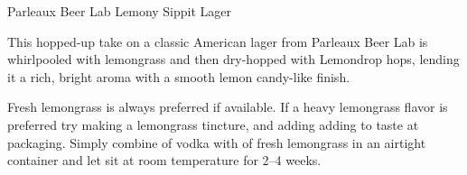 \stylesection{\styleamericanlager}

\begin{recipie}{Parleaux Beer Lab Lemony Sippit Lager}

\begin{aboutblock}
This hopped-up take on a classic American lager from Parleaux Beer Lab is whirlpooled
with lemongrass and then dry-hopped with Lemondrop hops, lending it a rich, bright aroma
with a smooth lemon candy-like finish.
\end{aboutblock}


\begin{methodandtiming}
  
\begin{mashsteps}
\end{mashsteps}

\begin{fermentationsteps}
\end{fermentationsteps}

\begin{directions}
Fresh lemongrass is always preferred if available. If a heavy lemongrass flavor is preferred
try making a lemongrass tincture, and adding adding to taste at packaging. Simply combine
 of vodka with  of fresh lemongrass in an airtight container and let sit at
room temperature for 2--4 weeks.
\end{directions}

\end{methodandtiming}

\pagebreak

\begin{ingredientsblock}

\begin{malts}
\end{malts}

\begin{hops}
\end{hops}

\begin{yeasts}
\end{yeasts}

\end{ingredientsblock}

\end{recipie}

